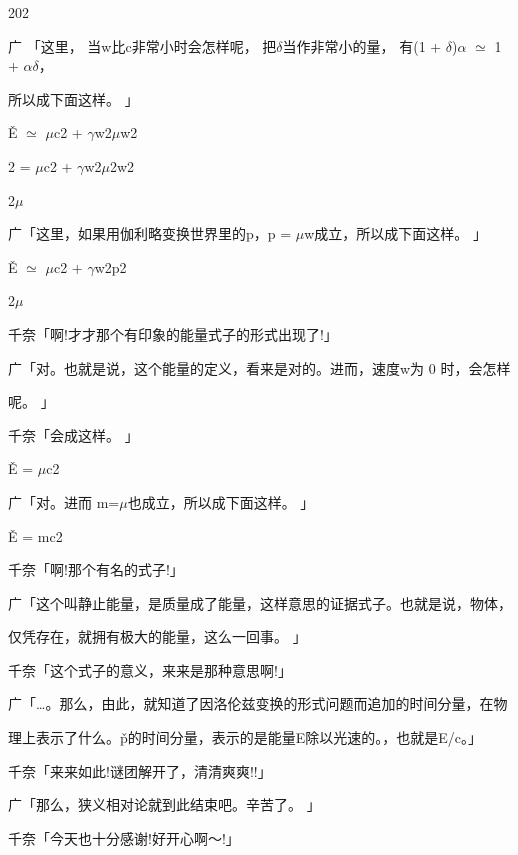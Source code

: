 202\par
广 「这里， 当w比c非常小时会怎样呢， 把$\delta$当作非常小的量， 有(1 + $\delta$)$\alpha$ $\simeq$ 1 + $\alpha$$\delta$，\par
所以成下面这样。 」\par
Ě $\simeq$ $\mu$c2 + $\gamma$w2$\mu$w2\par
2 = $\mu$c2 + $\gamma$w2$\mu$2w2\par
2$\mu$\par
广「这里，如果用伽利略变换世界里的p，p = $\mu$w成立，所以成下面这样。 」\par
Ě $\simeq$ $\mu$c2 + $\gamma$w2p2\par
2$\mu$\par
千奈「啊!才才那个有印象的能量式子的形式出现了!」\par
广「对。也就是说，这个能量的定义，看来是对的。进而，速度w为 0 时，会怎样\par
呢。 」\par
千奈「会成这样。 」\par
Ě = $\mu$c2\par
广「对。进而 m=$\mu$也成立，所以成下面这样。 」\par
Ě = mc2\par
千奈「啊!那个有名的式子!」\par
广「这个叫静止能量，是质量成了能量，这样意思的证据式子。也就是说，物体，\par
仅凭存在，就拥有极大的能量，这么一回事。 」\par
千奈「这个式子的意义，来来是那种意思啊!」\par
广「…。那么，由此，就知道了因洛伦兹变换的形式问题而追加的时间分量，在物\par
理上表示了什么。p̌的时间分量，表示的是能量E除以光速的。，也就是E/c。」\par
千奈「来来如此!谜团解开了，清清爽爽!!」\par
广「那么，狭义相对论就到此结束吧。辛苦了。 」\par
千奈「今天也十分感谢!好开心啊～!」\par

